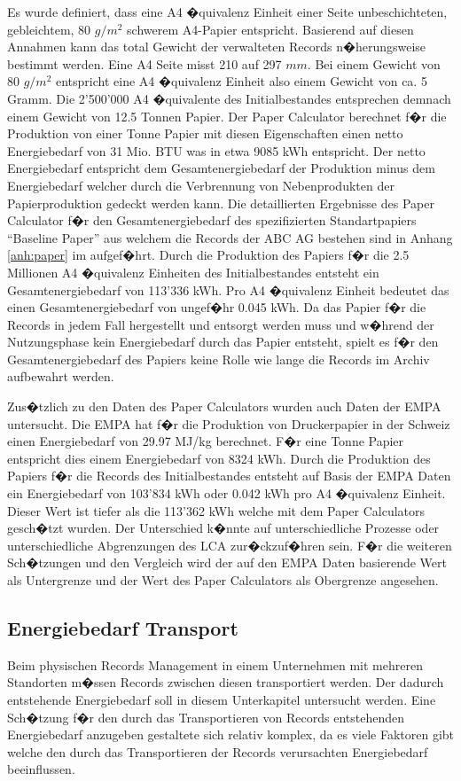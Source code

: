 \documentclass[a4paper,twoside,10pt]{report}
\begin{document}
Es wurde definiert, dass eine A4 �quivalenz Einheit einer Seite unbeschichteten, gebleichtem, 80 $g/m^2$ schwerem A4-Papier entspricht. Basierend auf diesen Annahmen kann das total Gewicht der verwalteten Records n�herungsweise bestimmt werden. Eine A4 Seite misst 210 auf 297 $mm$. Bei einem Gewicht von 80 $g/m^2$ entspricht eine A4 �quivalenz Einheit also einem Gewicht von ca. 5 Gramm. Die 2'500'000 A4 �quivalente des Initialbestandes entsprechen demnach einem Gewicht von 12.5 Tonnen Papier. Der Paper Calculator berechnet f�r die Produktion von einer Tonne Papier mit diesen Eigenschaften einen netto Energiebedarf von 31 Mio. BTU was in etwa 9085 kWh entspricht. Der netto Energiebedarf entspricht dem Gesamtenergiebedarf der Produktion minus dem Energiebedarf welcher durch die Verbrennung von Nebenprodukten der Papierproduktion gedeckt werden kann. Die detaillierten Ergebnisse des Paper Calculator f�r den Gesamtenergiebedarf des spezifizierten Standartpapiers "`Baseline Paper"' aus welchem die Records der ABC AG bestehen sind in Anhang \ref{anh:paper} im aufgef�hrt. Durch die Produktion des Papiers f�r die 2.5 Millionen A4 �quivalenz Einheiten des Initialbestandes entsteht ein Gesamtenergiebedarf von 113'336 kWh. Pro A4 �quivalenz Einheit bedeutet das einen Gesamtenergiebedarf von ungef�hr 0.045 kWh. Da das Papier f�r die Records in jedem Fall hergestellt und entsorgt werden muss und w�hrend der Nutzungsphase kein Energiebedarf durch das Papier entsteht, spielt es f�r den Gesamtenergiebedarf des Papiers keine Rolle wie lange die Records im Archiv aufbewahrt werden.

Zus�tzlich zu den Daten des Paper Calculators wurden auch Daten der \ac{EMPA} untersucht. Die \ac{EMPA} hat f�r die Produktion von Druckerpapier in der Schweiz einen Energiebedarf von 29.97 MJ/kg berechnet. F�r eine Tonne Papier entspricht dies einem Energiebedarf von 8324 kWh. Durch die Produktion des Papiers f�r die Records des Initialbestandes entsteht auf Basis der \ac{EMPA} Daten ein Energiebedarf von 103'834 kWh oder 0.042 kWh pro A4 �quivalenz Einheit. Dieser Wert ist tiefer als die 113'362 kWh welche mit dem Paper Calculators gesch�tzt wurden. Der Unterschied k�nnte auf unterschiedliche Prozesse oder unterschiedliche Abgrenzungen des \ac{LCA} zur�ckzuf�hren sein. F�r die weiteren Sch�tzungen und den Vergleich wird der auf den \ac{EMPA} Daten basierende Wert als Untergrenze und der Wert des Paper Calculators als Obergrenze angesehen. \cite{empa_daten}

\subsection{Energiebedarf Transport}
Beim physischen Records Management in einem Unternehmen mit mehreren Standorten m�ssen Records zwischen diesen transportiert werden. Der dadurch entstehende Energiebedarf soll in diesem Unterkapitel untersucht werden. Eine Sch�tzung f�r den durch das Transportieren von Records entstehenden Energiebedarf anzugeben gestaltete sich relativ komplex, da es viele Faktoren gibt welche den durch das Transportieren der Records verursachten Energiebedarf beeinflussen. 
\end{document}
